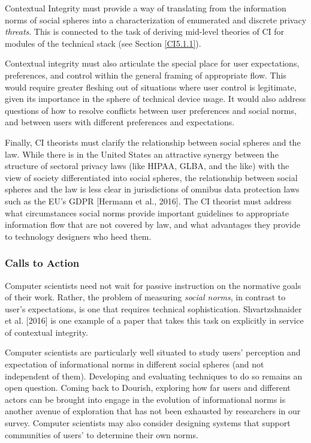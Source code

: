 \documentclass[../thesis.tex]{subfiles}
\begin{document}
Contextual Integrity must provide a way of translating from the
information norms of social spheres into a characterization of
enumerated and discrete privacy \textit{threats}. This is connected to
the task of deriving mid-level theories of CI for modules of the
technical stack (see Section \ref{CI5.1.1}).

Contextual integrity must also articulate the special place for user
expectations, preferences, and control within the general framing of
appropriate flow. This would require greater fleshing out of situations
where user control is legitimate, given its importance in the sphere of
technical device usage. It would also address questions of how to
resolve conflicts between user preferences and social norms, and
between users with different preferences and expectations.

Finally, CI theorists must clarify the relationship between social
spheres and the law. While there is in the United States an attractive
synergy between the structure of sectoral privacy laws (like HIPAA,
GLBA, and the like) with the view of society differentiated into social
spheres, the relationship between social spheres and the law is less
clear in jurisdictions of omnibus data protection laws such as the
EU's GDPR [Hermann et al., 2016]. The CI theorist must
address what circumstances social norms provide important guidelines to
appropriate information flow that are not covered by law, and what
advantages they provide to technology designers who heed them.

\subsubsection{Calls to Action}
\label{CI5.3.2}

Computer scientists need not wait for passive instruction on the
normative goals of their work. Rather, the problem of measuring
\textit{social norms}, in contrast to user's
expectations, is one that requires technical sophistication.
Shvartzshnaider et al. [2016] is one example of a paper that takes this
task on explicitly in service of contextual integrity.

Computer scientists are particularly well situated to study
users' perception and expectation of informational
norms in different social spheres (and not independent of them).
Developing and evaluating techniques to do so remains an open question.
Coming back to Dourish, exploring how far users and different actors
can be brought into engage in the evolution of informational norms is
another avenue of exploration that has not been exhausted by
researchers in our survey. Computer scientists may also consider
designing systems that support communities of users' to
determine their own norms.
\end{document}
